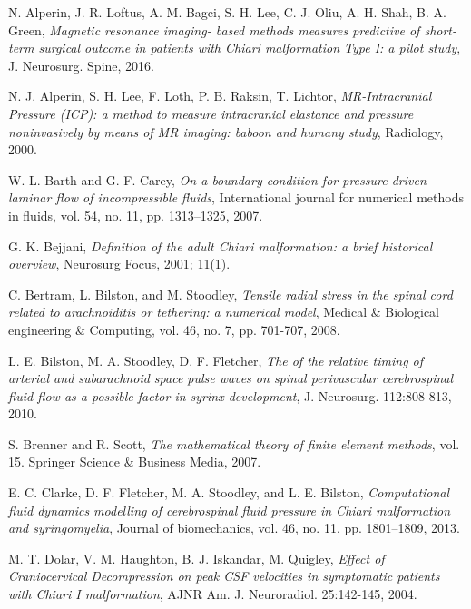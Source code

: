 \documentclass[a4paper,11pt,oneside]{book}
\begin{document}
\begin{thebibliography}{100}

 N. Alperin, J. R. Loftus, A. M. Bagci, S. H. Lee, C. J. Oliu, A. H. Shah, B. A. Green, \emph{Magnetic resonance imaging- based methods measures predictive of short-term surgical outcome in patients with Chiari malformation Type I: a pilot study}, J. Neurosurg. Spine, 2016.

 N. J. Alperin, S. H. Lee, F. Loth, P. B. Raksin, T. Lichtor, \emph{MR-Intracranial Pressure (ICP): a method to measure intracranial elastance and pressure noninvasively by means of MR imaging: baboon and humany study}, Radiology, 2000.

 W. L. Barth and G. F. Carey, \emph{On a boundary condition for pressure-driven laminar flow of incompressible fluids}, International journal for numerical methods in fluids, vol. 54, no. 11, pp. 1313–1325, 2007.


 G. K. Bejjani, \emph{Definition of the adult Chiari malformation: a brief historical overview}, Neurosurg Focus, 2001; 11(1).

 C. Bertram, L. Bilston, and M. Stoodley, \emph{Tensile radial stress in the spinal cord related to arachnoiditis or tethering: a numerical model}, Medical \& Biological engineering \& Computing, vol. 46, no. 7, pp. 701-707, 2008.

 L. E. Bilston, M. A. Stoodley, D. F. Fletcher, \emph{The of the relative timing of arterial and subarachnoid space pulse waves on spinal perivascular cerebrospinal fluid flow as a possible factor in syrinx development}, J. Neurosurg. 112:808-813, 2010.

 S. Brenner and R. Scott, \emph{The mathematical theory of finite element methods}, vol. 15. Springer Science \& Business Media, 2007.

 E. C. Clarke, D. F. Fletcher, M. A. Stoodley, and L. E. Bilston, \emph{Computational fluid dynamics modelling of cerebrospinal fluid pressure in Chiari malformation and syringomyelia}, Journal of biomechanics, vol. 46, no. 11, pp. 1801–1809,
2013.

 M. T. Dolar, V. M. Haughton, B. J. Iskandar, M. Quigley, \emph{Effect of Craniocervical Decompression on peak CSF velocities in symptomatic patients with Chiari I malformation}, AJNR Am. J. Neuroradiol. 25:142-145, 2004.


\end{thebibliography}
\end{document}
